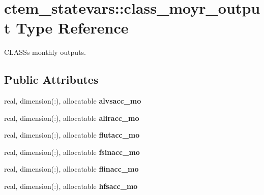 \hypertarget{structctem__statevars_1_1class__moyr__output}{}\section{ctem\+\_\+statevars\+:\+:class\+\_\+moyr\+\_\+output Type Reference}
\label{structctem__statevars_1_1class__moyr__output}


C\+L\+A\+S\+S\textquotesingle{}s monthly outputs.  


\subsection*{Public Attributes}
\begin{DoxyCompactItemize}
\item 
\hypertarget{structctem__statevars_1_1class__moyr__output_a3a7f702f098018f248898419cd389fc0}{}real, dimension(\+:), allocatable {\bfseries alvsacc\+\_\+mo}\label{structctem__statevars_1_1class__moyr__output_a3a7f702f098018f248898419cd389fc0}

\item 
\hypertarget{structctem__statevars_1_1class__moyr__output_aa584eb6a61cfacc6af39c7c2b4a995f9}{}real, dimension(\+:), allocatable {\bfseries aliracc\+\_\+mo}\label{structctem__statevars_1_1class__moyr__output_aa584eb6a61cfacc6af39c7c2b4a995f9}

\item 
\hypertarget{structctem__statevars_1_1class__moyr__output_aa2cd3b7b8aae27cb4d3262e85c2f42d4}{}real, dimension(\+:), allocatable {\bfseries flutacc\+\_\+mo}\label{structctem__statevars_1_1class__moyr__output_aa2cd3b7b8aae27cb4d3262e85c2f42d4}

\item 
\hypertarget{structctem__statevars_1_1class__moyr__output_a4406f8fdee328ccc91fe0c19bcc201b7}{}real, dimension(\+:), allocatable {\bfseries fsinacc\+\_\+mo}\label{structctem__statevars_1_1class__moyr__output_a4406f8fdee328ccc91fe0c19bcc201b7}

\item 
\hypertarget{structctem__statevars_1_1class__moyr__output_a8d32543ba261d453466aa9d3c7bc194c}{}real, dimension(\+:), allocatable {\bfseries flinacc\+\_\+mo}\label{structctem__statevars_1_1class__moyr__output_a8d32543ba261d453466aa9d3c7bc194c}

\item 
\hypertarget{structctem__statevars_1_1class__moyr__output_a52d453304b7c6f70a68c5639a1bab99c}{}real, dimension(\+:), allocatable {\bfseries hfsacc\+\_\+mo}\label{structctem__statevars_1_1class__moyr__output_a52d453304b7c6f70a68c5639a1bab99c}


\end{DoxyCompactItemize}
